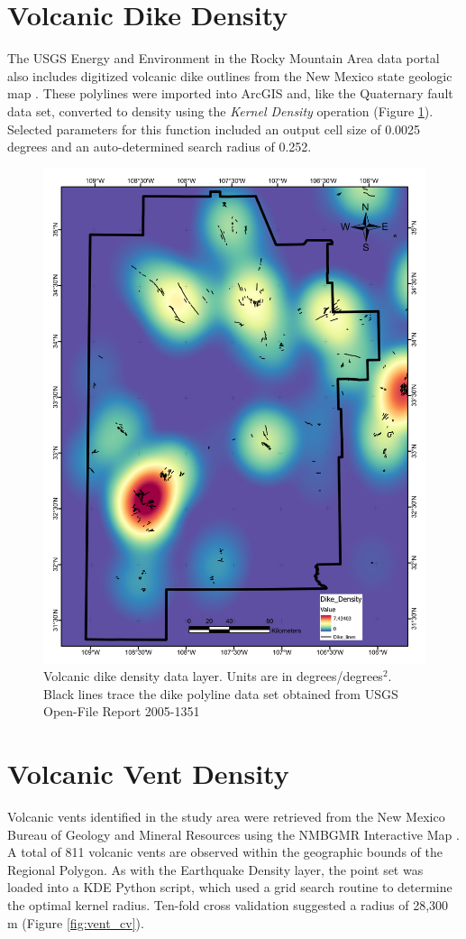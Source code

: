 \section{Volcanic Dike Density}\label{app:dl_dike_density}
The USGS Energy and Environment in the Rocky Mountain Area data portal \citep{usgs_eerma_2021} also includes digitized volcanic dike outlines from the New Mexico state geologic map \citep{stoeser_usgs_2005}. These polylines were imported into ArcGIS and, like the Quaternary fault data set, converted to density using the \textit{Kernel Density} operation (Figure \ref{fig:feat_dikes}). Selected parameters for this function included an output cell size of 0.0025 degrees and an auto-determined search radius of 0.252.

\begin{figure}[H]
\centering
\includegraphics[width=0.75\linewidth]{templates/images/Figure-DikeDensity.pdf}
\caption[Volcanic dike data layer]{Volcanic dike density data layer. Units are in degrees/degrees$^2$. Black lines trace the dike polyline data set obtained from USGS Open-File Report 2005-1351 \protect\citep{stoeser_usgs_2005}}
\label{fig:feat_dikes}
\end{figure}
\pagebreak

\section{Volcanic Vent Density}\label{app:dl_vent_density}
Volcanic vents identified in the study area were retrieved from the New Mexico Bureau of Geology and Mineral Resources using the NMBGMR Interactive Map \citep{nmbgmr_nmbgmr_2021}. A total of 811 volcanic vents are observed within the geographic bounds of the Regional Polygon. As with the Earthquake Density layer, the point set was loaded into a KDE Python script, which used a grid search routine to determine the optimal kernel radius. Ten-fold cross validation suggested a radius of 28,300 m (Figure \ref{fig:vent_cv}).

